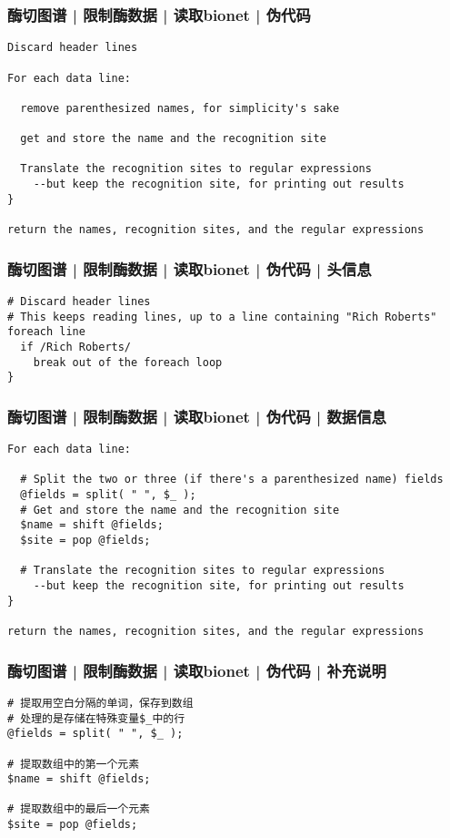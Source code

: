 \begin{frame}[fragile]
  \frametitle{酶切图谱 | 限制酶数据 | 读取bionet | 伪代码}
\begin{lstlisting}[basicstyle=\small\tt]
Discard header lines 

For each data line:

  remove parenthesized names, for simplicity's sake

  get and store the name and the recognition site

  Translate the recognition sites to regular expressions
    --but keep the recognition site, for printing out results
}

return the names, recognition sites, and the regular expressions
\end{lstlisting}
\end{frame}

\begin{frame}[fragile]
  \frametitle{酶切图谱 | 限制酶数据 | 读取bionet | 伪代码 | 头信息}
\begin{lstlisting}
# Discard header lines
# This keeps reading lines, up to a line containing "Rich Roberts"
foreach line 
  if /Rich Roberts/ 
    break out of the foreach loop
}
\end{lstlisting}
\end{frame}


\begin{frame}[fragile]
  \frametitle{酶切图谱 | 限制酶数据 | 读取bionet | 伪代码 | 数据信息}
  \vspace{-0.6em}
\begin{lstlisting}[basicstyle=\small\tt]
For each data line:

  # Split the two or three (if there's a parenthesized name) fields
  @fields = split( " ", $_ );
  # Get and store the name and the recognition site
  $name = shift @fields;
  $site = pop @fields;

  # Translate the recognition sites to regular expressions
    --but keep the recognition site, for printing out results
}

return the names, recognition sites, and the regular expressions
\end{lstlisting}
\end{frame}

\begin{frame}[fragile]
  \frametitle{酶切图谱 | 限制酶数据 | 读取bionet | 伪代码 | \alert{补充说明}}
\begin{lstlisting}
# 提取用空白分隔的单词，保存到数组
# 处理的是存储在特殊变量$_中的行
@fields = split( " ", $_ );

# 提取数组中的第一个元素
$name = shift @fields;

# 提取数组中的最后一个元素
$site = pop @fields;
\end{lstlisting}
\end{frame}

